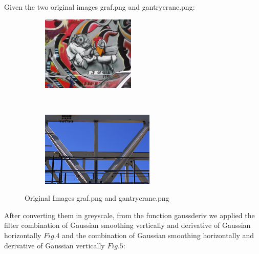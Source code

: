 \documentclass[
	12pt, %
]{fphw}
\begin{document}
Given the two original images graf.png and gantrycrane.png:

\begin{figure}[h!]
    \centering
    \begin{subfigure}[t]{0.5\textwidth}
        \centering
        \includegraphics[height=1.4in]{img/1e/graf.png}

    \end{subfigure}%
    ~ 
    \begin{subfigure}[t]{0.4\textwidth}
        \centering
        \includegraphics[height=1.4in]{img/1e/gantrycrane.png}

	\end{subfigure}
	\caption{Original Images graf.png and gantrycrane.png}
\end{figure}


After converting them in greyscale, from the function gaussderiv we applied the filter combination of Gaussian smoothing vertically and derivative of Gaussian horizontally \(Fig. 4\) and the combination of Gaussian smoothing horizontally and derivative of Gaussian vertically \(Fig. 5\):
\end{document}
